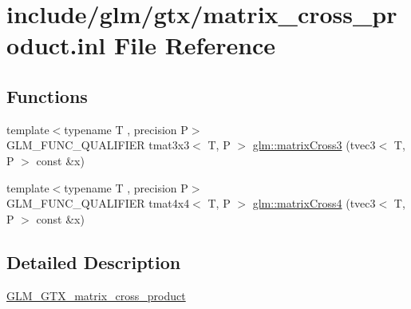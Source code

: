 \hypertarget{matrix__cross__product_8inl}{}\section{include/glm/gtx/matrix\+\_\+cross\+\_\+product.inl File Reference}
\label{matrix__cross__product_8inl}
\subsection*{Functions}
\begin{DoxyCompactItemize}
\item 
{\footnotesize template$<$typename T , precision P$>$ }\\G\+L\+M\+\_\+\+F\+U\+N\+C\+\_\+\+Q\+U\+A\+L\+I\+F\+I\+ER tmat3x3$<$ T, P $>$ \hyperlink{group__gtx__matrix__cross__product_ga04385b2e3a93c78d116b51af2d8d708e}{glm\+::matrix\+Cross3} (tvec3$<$ T, P $>$ const \&x)
\item 
{\footnotesize template$<$typename T , precision P$>$ }\\G\+L\+M\+\_\+\+F\+U\+N\+C\+\_\+\+Q\+U\+A\+L\+I\+F\+I\+ER tmat4x4$<$ T, P $>$ \hyperlink{group__gtx__matrix__cross__product_ga2d46cc5253761c214aa5c782865156b1}{glm\+::matrix\+Cross4} (tvec3$<$ T, P $>$ const \&x)
\end{DoxyCompactItemize}


\subsection{Detailed Description}
\hyperlink{group__gtx__matrix__cross__product}{G\+L\+M\+\_\+\+G\+T\+X\+\_\+matrix\+\_\+cross\+\_\+product} 